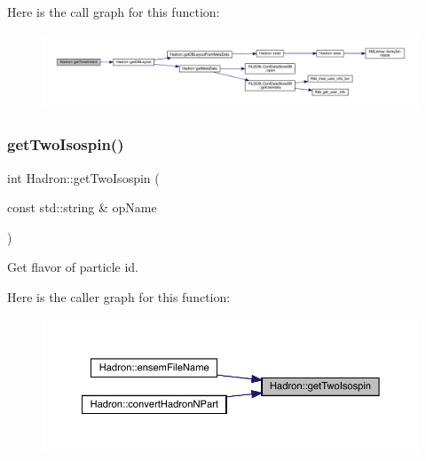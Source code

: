 Here is the call graph for this function\+:
\nopagebreak
\begin{figure}[H]
\begin{center}
\leavevmode
\includegraphics[width=350pt]{d1/daf/namespaceHadron_a660c9f3adc1525c9d326b23398d09494_cgraph}
\end{center}
\end{figure}
\mbox{\label{namespaceHadron_a28f936e0038f56334a16574038c9aa0b}} 
\subsubsection{\texorpdfstring{getTwoIsospin()}{getTwoIsospin()}}
{\footnotesize\ttfamily int Hadron\+::get\+Two\+Isospin (\begin{DoxyParamCaption}\item[{const std\+::string \&}]{op\+Name }\end{DoxyParamCaption})}



Get flavor of particle id. 

Here is the caller graph for this function\+:
\nopagebreak
\begin{figure}[H]
\begin{center}
\leavevmode
\includegraphics[width=350pt]{d1/daf/namespaceHadron_a28f936e0038f56334a16574038c9aa0b_icgraph}
\end{center}
\end{figure}
\mbox{\label{namespaceHadron_ab7c3962155ebb71e6377424d11c29daa}} 
